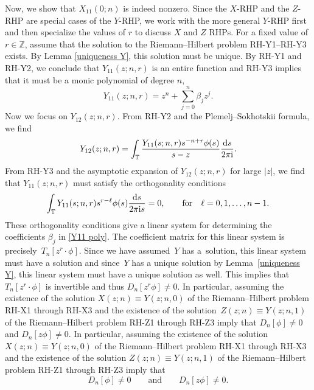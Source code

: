 \documentclass[pdftex]{sigma}
\numberwithin{equation}{section}
\newcommand{\Z}{{\mathbb Z}}
\newcommand{\T}{{\mathbb T}}
\newcommand{\be}{\beta}
\newcommand{\ii}{{\rm i}}
\newcommand{\dd}{{\rm d}}
\newcommand{\qandq}{\qquad \text{and} \qquad}
\begin{document}
	Now, we show that $X_{11}(0;n)$ is indeed nonzero. Since the $X$-RHP and the $Z$-RHP are special cases of the $Y$-RHP, we work with the more general $Y$-RHP first and then specialize the values of $r$ to discuss $X$ and $Z$ RHPs. For a fixed value of $r \in \Z$, assume that the solution to the Riemann--Hilbert problem {\rm RH-Y1}--{\rm RH-Y3} exists. By Lemma \ref{uniqueness Y}, this solution must be unique. By {\rm RH-Y1} and {\rm RH-Y2}, we conclude that $Y_{11}(z;n,r)$ is an entire function and {\rm RH-Y3} implies that it must be a monic polynomial of degree $n$,
	\begin{equation}\label{Y11 poly}
		Y_{11}(z;n,r) = z^n + \sum_{j=0}^{n} \be_j z^j.
	\end{equation}
Now we focus on $Y_{12}(z;n,r)$. From {\rm RH-Y2} and the Plemelj--Sokhotskii formula, we find
	\begin{equation}\label{Y12}
		Y_{12}(z;n,r) = \int_{\T} \frac{Y_{11}(s;n,r)s^{-n+r}\phi(s)}{s-z} \frac{\dd s}{2 \pi \ii}.
	\end{equation}
	From {\rm RH-Y3} and the asymptotic expansion of $Y_{12}(z;n,r)$ for large $|z|$, we find that $Y_{11}(z;n,r)$ must satisfy the orthogonality conditions
	\begin{equation}\label{ort conds}
		\int_{\T} Y_{11}(s;n,r)s^{r-\ell}\phi(s) \frac{\dd s}{2 \pi \ii s} = 0, \qquad \mbox{for} \quad \ell = 0,1, \dots, n-1.
	\end{equation}
	These orthogonality conditions give a linear system for determining the coefficients $\be_j$ in \eqref{Y11 poly}. The coefficient matrix for this linear system is precisely~${T_n[z^r\cdot \phi]}$. Since we have assumed~$Y$ has a~solution, this linear system must have a solution and since~$Y$ has a unique solution by Lemma~\ref{uniqueness Y}, this linear system must have a unique solution as well. This implies that~${T_n[z^r\cdot \phi]}$ is invertible and thus $D_{n}[z^r\phi] \neq 0$.
	In particular, assuming the existence of the solution ${X(z;n) \equiv Y(z;n,0)}$ of the Riemann--Hilbert problem {\rm RH-X1} through {\rm RH-X3} and the existence of the solution~${Z(z;n) \equiv Y(z;n,1)}$ of the Riemann--Hilbert problem {\rm RH-Z1} through {\rm RH-Z3} imply that $D_n[\phi] \neq 0$ and $D_n[z\phi] \neq 0$.
In particular, assuming the existence of the solution $X(z;n) \equiv Y(z;n,0)$ of the Riemann--Hilbert problem {\rm RH-X1} through {\rm RH-X3} and the existence of the solution $Z(z;n) \equiv Y(z;n,1)$ of the Riemann--Hilbert problem {\rm RH-Z1} through {\rm RH-Z3} imply that
	\begin{equation}\label{nonzero dets}
		D_{n}[\phi] \neq 0 \qandq D_n[z\phi] \neq 0.
	\end{equation}
\end{document}
